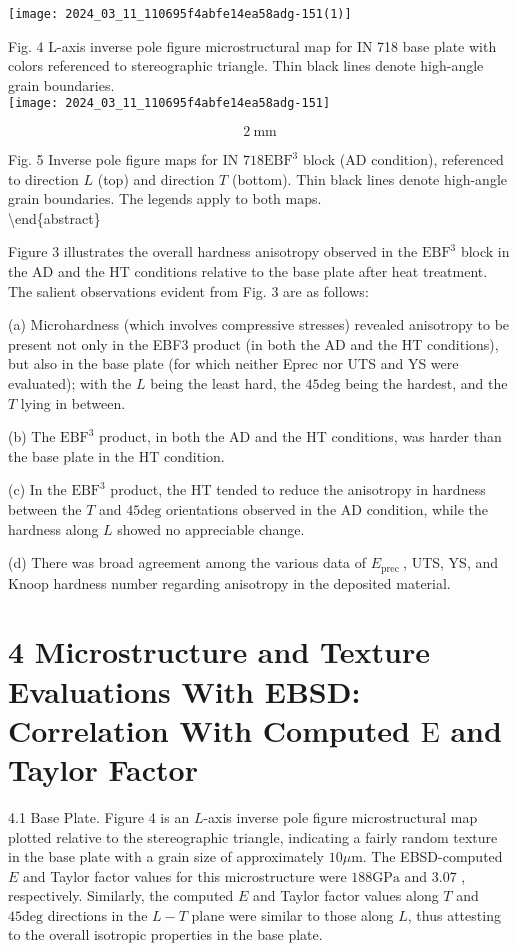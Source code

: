 \documentclass[10pt]{article}
\begin{document}
\begin{center}
\texttt{[image: 2024\_03\_11\_110695f4abfe14ea58adg-151(1)]}
\end{center}

Fig. 4 L-axis inverse pole figure microstructural map for IN 718 base plate with colors referenced to stereographic triangle. Thin black lines denote high-angle grain boundaries.\\
\texttt{[image: 2024\_03\_11\_110695f4abfe14ea58adg-151]}

$$
2 \mathrm{~mm}
$$

Fig. 5 Inverse pole figure maps for IN $718 \mathrm{EBF}^{3}$ block (AD condition), referenced to direction $L$ (top) and direction $T$ (bottom). Thin black lines denote high-angle grain boundaries. The legends apply to both maps.\\
\textbackslash end\{abstract\}

Figure 3 illustrates the overall hardness anisotropy observed in the $\mathrm{EBF}^{3}$ block in the $\mathrm{AD}$ and the $\mathrm{HT}$ conditions relative to the base plate after heat treatment. The salient observations evident from Fig. 3 are as follows:

(a) Microhardness (which involves compressive stresses) revealed anisotropy to be present not only in the EBF3 product (in both the $\mathrm{AD}$ and the HT conditions), but also in the base plate (for which neither Eprec nor UTS and YS were evaluated); with the $L$ being the least hard, the $45 \mathrm{deg}$ being the hardest, and the $T$ lying in between.

(b) The $\mathrm{EBF}^{3}$ product, in both the $\mathrm{AD}$ and the HT conditions, was harder than the base plate in the HT condition.

(c) In the $\mathrm{EBF}^{3}$ product, the HT tended to reduce the anisotropy in hardness between the $T$ and $45 \mathrm{deg}$ orientations observed in the AD condition, while the hardness along $L$ showed no appreciable change.

(d) There was broad agreement among the various data of $E_{\text {prec }}$, UTS, YS, and Knoop hardness number regarding anisotropy in the deposited material.

\section*{4 Microstructure and Texture Evaluations With EBSD: Correlation With Computed $\mathrm{E}$ and Taylor Factor}
4.1 Base Plate. Figure 4 is an $L$-axis inverse pole figure microstructural map plotted relative to the stereographic triangle, indicating a fairly random texture in the base plate with a grain size of approximately $10 \mu \mathrm{m}$. The EBSD-computed $E$ and Taylor factor values for this microstructure were $188 \mathrm{GPa}$ and 3.07 , respectively. Similarly, the computed $E$ and Taylor factor values along $T$ and $45 \mathrm{deg}$ directions in the $L-T$ plane were similar to those along $L$, thus attesting to the overall isotropic properties in the base plate.
\end{document}
